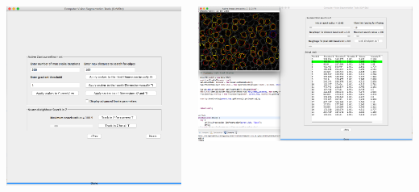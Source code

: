 \documentclass{curietheme} %
\begin{document}
{\begin{columns}
\begin{column}{0.33\textwidth}
{\includegraphics[clip=true,width=1\textwidth]{CoVisTo-panel2.png}}\\
\end{column}
 \begin{column}{0.33\textwidth} 
 
{\includegraphics[clip=true,width=1\textwidth]{CoVisTo-panel3.png}}\\
\end{column}
\end{columns}


}
\end{document}
